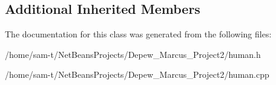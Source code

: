 \subsection*{Additional Inherited Members}


The documentation for this class was generated from the following files\+:\begin{DoxyCompactItemize}
\item 
/home/sam-\/t/\+Net\+Beans\+Projects/\+Depew\+\_\+\+Marcus\+\_\+\+Project2/human.\+h\item 
/home/sam-\/t/\+Net\+Beans\+Projects/\+Depew\+\_\+\+Marcus\+\_\+\+Project2/human.\+cpp\end{DoxyCompactItemize}
